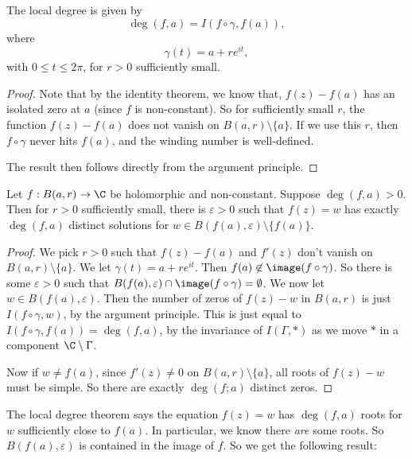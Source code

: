 \documentclass[a4paper]{article}
\begin{document}
\begin{lemma}
  The local degree is given by
  \[
    \deg (f, a) = I (f \circ \gamma, f(a)),
  \]
  where
  \[
    \gamma(t) = a + re^{it},
  \]
  with $0 \leq t \leq 2\pi$, for $r > 0$ sufficiently small.
\end{lemma}

\begin{proof}
  Note that by the identity theorem, we know that, $f(z) - f(a)$ has an isolated zero at $a$ (since $f$ is non-constant). So for sufficiently small $r$, the function $f(z) - f(a)$ does not vanish on $\overline{B(a, r)} \setminus \{a\}$. If we use this $r$, then $f \circ \gamma$ never hits $f(a)$, and the winding number is well-defined.

  The result then follows directly from the argument principle.
\end{proof}

\begin{prop}
  Let $f: B(a, r) \to \C$ be holomorphic and non-constant. Suppose $\deg(f, a) > 0$. Then for $r > 0$ sufficiently small, there is $\varepsilon > 0$ such that $f(z) = w$ has exactly $\deg(f, a)$ distinct solutions for $w \in B(f(a), \varepsilon) \setminus \{f(a)\}$.
\end{prop}

\begin{proof}
  We pick $r > 0$ such that $f(z) - f(a)$ and $f'(z)$ don't vanish on $B(a, r) \setminus \{a\}$. We let $\gamma(t) = a + re^{it}$. Then $f(a) \not\in \image(f \circ \gamma)$. So there is some $\varepsilon > 0$ such that $B(f(a), \varepsilon) \cap \image(f \circ \gamma) = \emptyset$. We now let $w \in B(f(a), \varepsilon)$. Then the number of zeros of $f(z) - w$ in $B(a, r)$ is just $I(f \circ \gamma, w)$, by the argument principle. This is just equal to $I(f \circ \gamma, f(a)) = \deg(f, a)$, by the invariance of $I(\Gamma, *)$ as we move $*$ in a component $\C \setminus \Gamma$.

  Now if $w \not= f(a)$, since $f'(z) \not= 0$ on $B(a, r)\setminus \{a\}$, all roots of $f(z) - w$ must be simple. So there are exactly $\deg (f; a)$ distinct zeros.
\end{proof}

The local degree theorem says the equation $f(z) = w$ has $\deg(f, a)$ roots for $w$ sufficiently close to $f(a)$. In particular, we know there \emph{are} some roots. So $B(f(a), \varepsilon)$ is contained in the image of $f$. So we get the following result:
\end{document}
